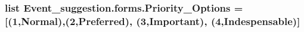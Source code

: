 \subsubsection[{\texorpdfstring{Priority\+\_\+\+Options}{Priority_Options}}]{\setlength{\rightskip}{0pt plus 5cm}list Event\+\_\+suggestion.\+forms.\+Priority\+\_\+\+Options = \mbox{[}(\textquotesingle{}1\textquotesingle{},\textquotesingle{}Normal\textquotesingle{}),(\textquotesingle{}2\textquotesingle{},\textquotesingle{}Preferred\textquotesingle{}), (\textquotesingle{}3\textquotesingle{},\textquotesingle{}Important\textquotesingle{}), (\textquotesingle{}4\textquotesingle{},\textquotesingle{}Indespensable\textquotesingle{})\mbox{]}}\hypertarget{namespaceEvent__suggestion_1_1forms_ae0ee75286c8408a63046b0fabfc8dd6f}{}\label{namespaceEvent__suggestion_1_1forms_ae0ee75286c8408a63046b0fabfc8dd6f}
